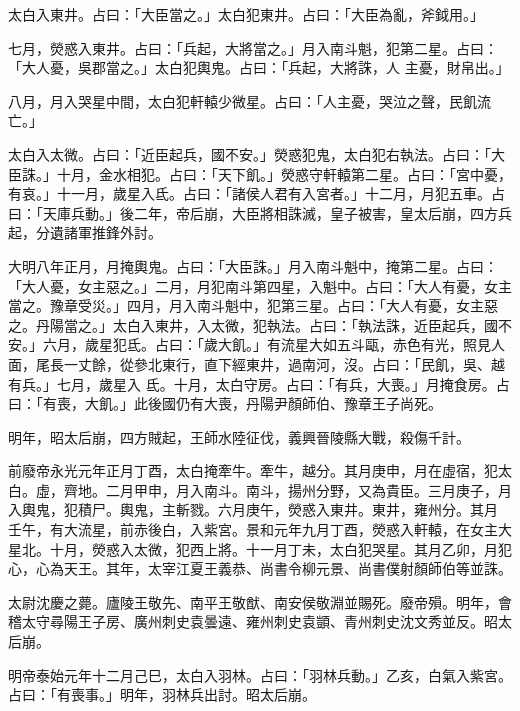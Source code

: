 \begin{pinyinscope}
 太白入東井。占曰：「大臣當之。」太白犯東井。占曰：「大臣為亂，斧鉞用。」



 七月，熒惑入東井。占曰：「兵起，大將當之。」月入南斗魁，犯第二星。占曰：「大人憂，吳郡當之。」太白犯輿鬼。占曰：「兵起，大將誅，人
 主憂，財帛出。」



 八月，月入哭星中間，太白犯軒轅少微星。占曰：「人主憂，哭泣之聲，民飢流亡。」



 太白入太微。占曰：「近臣起兵，國不安。」熒惑犯鬼，太白犯右執法。占曰：「大臣誅。」十月，金水相犯。占曰：「天下飢。」熒惑守軒轅第二星。占曰：「宮中憂，有哀。」十一月，歲星入氐。占曰：「諸侯人君有入宮者。」十二月，月犯五車。占曰：「天庫兵動。」後二年，帝后崩，大臣將相誅滅，皇子被害，皇太后崩，四方兵起，分遺諸軍推鋒外討。



 大明八年正月，月掩輿鬼。占曰：「大臣誅。」月入南斗魁中，掩第二星。占曰：「大人憂，女主惡之。」二月，月犯南斗第四星，入魁中。占曰：「大人有憂，女主當之。豫章受災。」四月，月入南斗魁中，犯第三星。占曰：「大人有憂，女主惡之。丹陽當之。」太白入東井，入太微，犯執法。占曰：「執法誅，近臣起兵，國不安。」六月，歲星犯氐。占曰：「歲大飢。」有流星大如五斗甌，赤色有光，照見人面，尾長一丈餘，從參北東行，直下經東井，過南河，沒。占曰：「民飢，吳、越有兵。」七月，歲星入
 氐。十月，太白守房。占曰：「有兵，大喪。」月掩食房。占曰：「有喪，大飢。」此後國仍有大喪，丹陽尹顏師伯、豫章王子尚死。



 明年，昭太后崩，四方賊起，王師水陸征伐，義興晉陵縣大戰，殺傷千計。



 前廢帝永光元年正月丁酉，太白掩牽牛。牽牛，越分。其月庚申，月在虛宿，犯太白。虛，齊地。二月甲申，月入南斗。南斗，揚州分野，又為貴臣。三月庚子，月入輿鬼，犯積尸。輿鬼，主斬戮。六月庚午，熒惑入東井。東井，雍州分。其月
 壬午，有大流星，前赤後白，入紫宮。景和元年九月丁酉，熒惑入軒轅，在女主大星北。十月，熒惑入太微，犯西上將。十一月丁未，太白犯哭星。其月乙卯，月犯心，心為天王。其年，太宰江夏王義恭、尚書令柳元景、尚書僕射顏師伯等並誅。



 太尉沈慶之薨。廬陵王敬先、南平王敬猷、南安侯敬淵並賜死。廢帝殞。明年，會稽太守尋陽王子房、廣州刺史袁曇遠、雍州刺史袁顗、青州刺史沈文秀並反。昭太后崩。



 明帝泰始元年十二月己巳，太白入羽林。占曰：「羽林兵動。」乙亥，白氣入紫宮。占曰：「有喪事。」明年，羽林兵出討。昭太后崩。




\end{pinyinscope}
